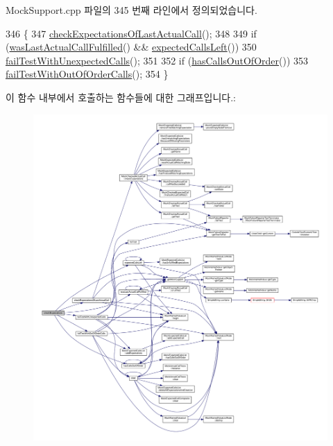 Mock\+Support.\+cpp 파일의 345 번째 라인에서 정의되었습니다.


\begin{DoxyCode}
346 \{
347     \hyperlink{class_mock_support_a74d9a767d0ce83fb496ce64be8cf2851}{checkExpectationsOfLastActualCall}();
348 
349     \textcolor{keywordflow}{if} (\hyperlink{class_mock_support_acd935c1e39f057e15d9d266481f2b1e1}{wasLastActualCallFulfilled}() && 
      \hyperlink{class_mock_support_a3c92e50fa7fae84cbf827632ba5d7e11}{expectedCallsLeft}())
350         \hyperlink{class_mock_support_a9eb46acf7715cffd19f883f1b3d69fbc}{failTestWithUnexpectedCalls}();
351 
352     \textcolor{keywordflow}{if} (\hyperlink{class_mock_support_aa89b3718eac29065f072462df28ed6c3}{hasCallsOutOfOrder}())
353         \hyperlink{class_mock_support_ac2e23964ac5bc99117629d22524a4ce3}{failTestWithOutOfOrderCalls}();
354 \}
\end{DoxyCode}


이 함수 내부에서 호출하는 함수들에 대한 그래프입니다.\+:
\nopagebreak
\begin{figure}[H]
\begin{center}
\leavevmode
\includegraphics[width=350pt]{class_mock_support_aaf94db2d926ab0a1cae9fc65c7eec54c_cgraph}
\end{center}
\end{figure}




